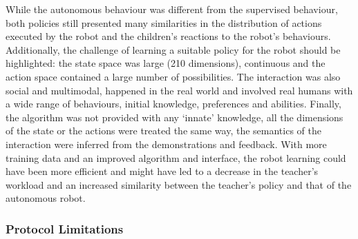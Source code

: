 While the autonomous behaviour was different from the supervised behaviour, both policies still presented many similarities in the distribution of actions executed by the robot and the children's reactions to the robot's behaviours. Additionally, the challenge of learning a suitable policy for the robot should be highlighted: the state space was large (210 dimensions), continuous and the action space contained a large number of possibilities. The interaction was also social and multimodal, happened in the real world and involved real humans with a wide range of behaviours, initial knowledge, preferences and abilities. Finally, the algorithm was not provided with any `innate' knowledge, all the dimensions of the state or the actions were treated the same way, the semantics of the interaction were inferred from the demonstrations and feedback. With more training data and an improved algorithm and interface, the robot learning could have been more efficient and might have led to a decrease in the teacher's workload and an increased similarity between the teacher's policy and that of the autonomous robot. 

\subsubsection{Protocol Limitations}

